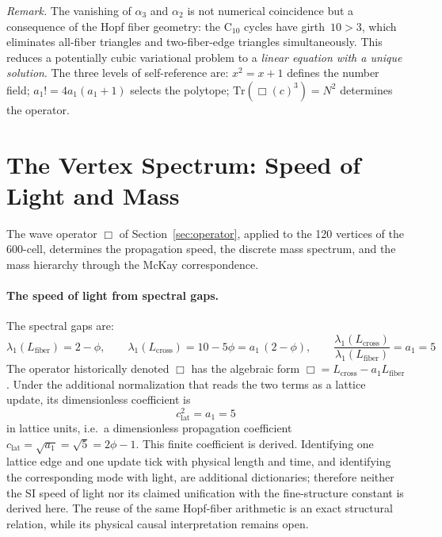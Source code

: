 \documentclass[12pt,a4paper]{article}
\theoremstyle{definition}
\begin{document}
\noindent\textit{Remark.}  The vanishing of $\alpha_3$ and $\alpha_2$ is not numerical coincidence but a consequence of the Hopf fiber geometry: the C$_{10}$ cycles have girth~$10 > 3$, which eliminates all-fiber triangles and two-fiber-edge triangles simultaneously.  This reduces a potentially cubic variational problem to a \emph{linear equation with a unique solution}.  The three levels of self-reference are: $x^2 = x + 1$ defines the number field; $a_1! = 4a_1(a_1\!+\!1)$ selects the polytope; $\mathrm{Tr}(\Box(c)^3) = N^2$ determines the operator.



\section{The Vertex Spectrum: Speed of Light and Mass}
\label{sec:vertex_spectrum}

The wave operator $\Box$ of Section~\ref{sec:operator}, applied to the 120 vertices of the 600-cell, determines the propagation speed, the discrete mass spectrum, and the mass hierarchy through the McKay correspondence.

\paragraph{The speed of light from spectral gaps.}
The spectral gaps are:
\begin{equation}
\lambda_1(L_{\mathrm{fiber}}) = 2 - \phi, \qquad
\lambda_1(L_{\mathrm{cross}}) = 10 - 5\phi = a_1\,(2 - \phi), \qquad
\frac{\lambda_1(L_{\mathrm{cross}})}{\lambda_1(L_{\mathrm{fiber}})} = a_1 = 5
\label{eq:spectral_gap_ratio}
\end{equation}
The operator historically denoted $\Box$ has the algebraic form $\Box=L_{\mathrm{cross}}-a_1L_{\mathrm{fiber}}$.  Under the additional normalization that reads the two terms as a lattice update, its dimensionless coefficient is
\begin{equation}
\boxed{c_{\mathrm{lat}}^2 = a_1 = 5}
\label{eq:c_squared}
\end{equation}
in lattice units, i.e.\ a dimensionless propagation coefficient $c_{\mathrm{lat}}=\sqrt{a_1}=\sqrt{5}=2\phi-1$.  This finite coefficient is derived.  Identifying one lattice edge and one update tick with physical length and time, and identifying the corresponding mode with light, are additional dictionaries; therefore neither the SI speed of light nor its claimed unification with the fine-structure constant is derived here.  The reuse of the same Hopf-fiber arithmetic is an exact structural relation, while its physical causal interpretation remains open.
\end{document}
